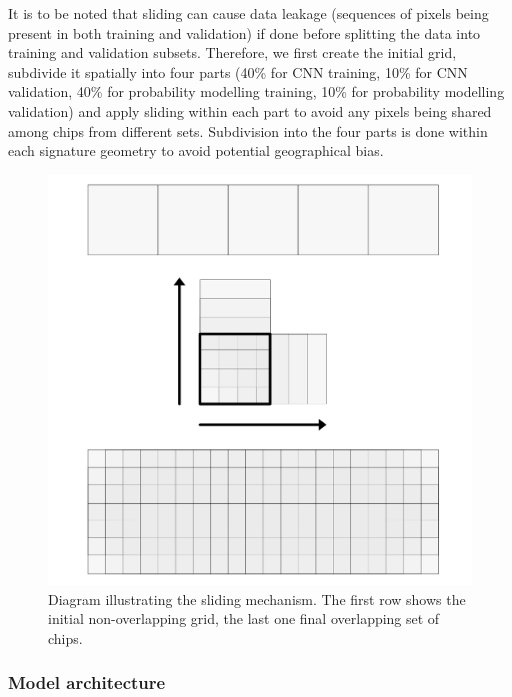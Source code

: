 It is to be noted that sliding can cause data leakage (sequences of pixels being
present in both training and validation) if done before splitting the data into
training and validation subsets. Therefore, we first create the initial grid, subdivide
it spatially into four parts (40\% for CNN training, 10\% for CNN validation, 40\% for
probability modelling training, 10\% for probability modelling validation) and apply
sliding within each part to avoid any pixels being shared among chips from different
sets. Subdivision into the four parts is done within each signature geometry to avoid
potential geographical bias.

\begin{figure}
    \centering
    \includegraphics[width=.8\linewidth]{fig/sliding.png}
    \caption{Diagram illustrating the sliding mechanism. The first row shows the initial non-overlapping grid, the last one final overlapping set of chips.}
    \label{fig:sliding}
\end{figure}


\subsubsection{Model architecture}



